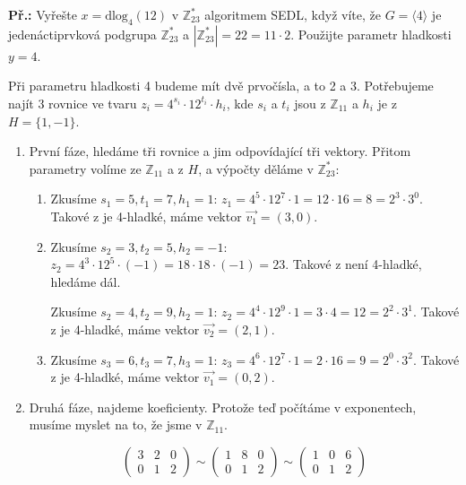 \begin{exercise}
\textbf{Př.:} Vyřešte $x = \text{dlog}_4 (12)$ v $\mathbb{Z}_{23}^*$ algoritmem
SEDL, když víte, že $G = \langle 4 \rangle$ je jedenáctiprvková podgrupa
$\mathbb{Z}_{23}^*$ a $|\mathbb{Z}_{23}^*| = 22 = 11 \cdot 2$. Použijte parametr
hladkosti $y = 4$.

Při parametru hladkosti 4 budeme mít dvě prvočísla, a to 2 a 3. Potřebujeme
najít 3 rovnice ve tvaru $z_i = 4^{s_i}\cdot 12^{t_i}\cdot h_i$, kde $s_i$ a
$t_i$ jsou z $\mathbb{Z}_{11}$ a $h_i$ je z $H = \{1, -1\}$.

\begin{enumerate}

\item První fáze, hledáme tři rovnice a jim odpovídající tři vektory. Přitom
parametry volíme ze $\mathbb{Z}_{11}$ a z $H$, a výpočty děláme v
$\mathbb{Z}_{23}^*$:

\begin{enumerate}
\item Zkusíme $s_1 = 5, t_1 = 7, h_1 = 1$: $z_1 = 4^5 \cdot 12^7 \cdot 1 = 12
\cdot 16 = 8 = 2^3 \cdot 3^0$. Takové z je 4-hladké, máme vektor $\vec{v_1} =
(3, 0)$.
\item Zkusíme $s_2 = 3, t_2 = 5, h_2 = -1$: $z_2 = 4^3 \cdot 12^5 \cdot (-1) =
18 \cdot 18 \cdot (-1) = 23 $. Takové z není 4-hladké, hledáme dál.

Zkusíme $s_2 = 4, t_2 = 9, h_2 = 1$: $z_2 = 4^4 \cdot 12^9 \cdot 1= 3 \cdot 4 =
12 = 2^2 \cdot 3^1 $. Takové z je 4-hladké, máme vektor $\vec{v_2} = (2, 1)$.
\item Zkusíme $s_3 = 6, t_3 = 7, h_3 = 1$: $z_3 = 4^6 \cdot 12^7 \cdot 1 = 2
\cdot 16 = 9 = 2^0 \cdot 3^2$. Takové z je 4-hladké, máme vektor $\vec{v_1} =
(0, 2)$.
\end{enumerate}
\item Druhá fáze, najdeme koeficienty. Protože teď počítáme v exponentech,
musíme myslet na to, že jsme v $\mathbb{Z}_{11}$.

\[ \left( \begin{array}{ccc}
3 & 2 & 0\\
0 & 1 & 2 \end{array} \right)
%
\sim
%
\left( \begin{array}{ccc}
1 & 8 & 0\\
0 & 1 & 2 \end{array} \right)
%
\sim
%
\left( \begin{array}{ccc}
1 & 0 & 6\\
0 & 1 & 2 \end{array} \right) \]


\end{enumerate}
\end{exercise}

